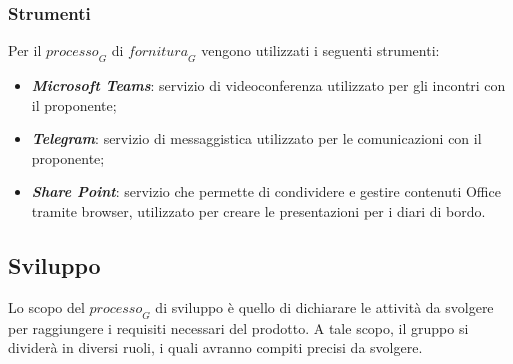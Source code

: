 \subsubsection{Strumenti}
Per il $\textit{processo}_G$ di $\textit{fornitura}_G$ vengono utilizzati i seguenti strumenti:
\begin{itemize}
    \item \emph{\textbf{Microsoft Teams}}: servizio di videoconferenza utilizzato per gli incontri con il proponente;
    \item \emph{\textbf{Telegram}}: servizio di messaggistica utilizzato per le comunicazioni con il proponente;
    \item \emph{\textbf{Share Point}}: servizio che permette di condividere e gestire contenuti Office tramite browser, utilizzato per creare le presentazioni per i diari di bordo.
\end{itemize}

\subsection{Sviluppo}
Lo scopo del $\textit{processo}_G$ di sviluppo è quello di dichiarare le attività da svolgere per raggiungere i requisiti necessari del prodotto.
A tale scopo, il gruppo si dividerà in diversi ruoli, i quali avranno compiti precisi da svolgere.

